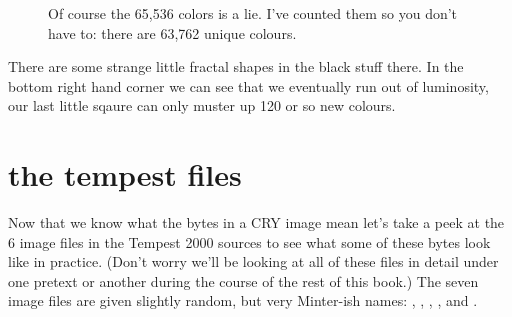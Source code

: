 \begin{figure}[H]
    \centering
    \begin{adjustbox}{width=5cm,center}
    \end{adjustbox}
\caption{Of course the 65,536 colors is a lie. I've counted them so you don't have to: there are 63,762 unique colours.}
\end{figure}

There are some strange little fractal shapes in the black stuff there. In the bottom right hand corner we can see that we eventually
run out of luminosity, our last little sqaure can only muster up 120 or so new colours.

\section*{the tempest files}
Now that we know what the bytes in a CRY image mean let's take a peek at the 6 image files in the Tempest 2000 sources to 
see what some of these bytes look like in practice. (Don't worry we'll be looking at all of these files in detail under one pretext
or another during the course of the rest of this book.) The seven image files are given slightly random, but very Minter-ish names: 
, , , ,  and  .


